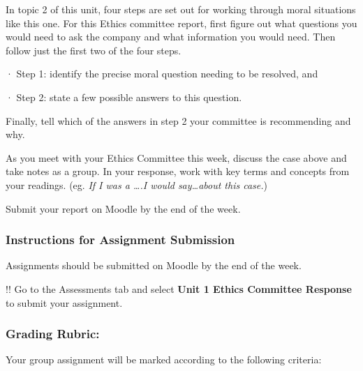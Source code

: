 \documentclass[
]{book}
\begin{document}
In topic 2 of this unit, four steps are set out for working through moral situations like this one. For this Ethics committee report, first figure out what questions you would need to ask the company and what information you would need. Then follow just the first two of the four steps.

· Step 1: identify the precise moral question needing to be resolved, and

· Step 2: state a few possible answers to this question.

Finally, tell which of the answers in step 2 your committee is recommending and why.

As you meet with your Ethics Committee this week, discuss the case above and
take notes as a group. In your response, work with key terms and concepts from
your readings. (eg. \emph{If I was a \ldots.I would say\ldots about this case.})

Submit your report on Moodle by the end of the week.

\hypertarget{instructions-for-assignment-submission-1}{%
\subsubsection{Instructions for Assignment Submission}\label{instructions-for-assignment-submission-1}}

Assignments should be submitted on Moodle by the end of the week.

!! Go to the Assessments tab and select \textbf{Unit 1 Ethics Committee Response} to submit your assignment.

\hypertarget{grading-rubric-1}{%
\subsubsection{Grading Rubric:}\label{grading-rubric-1}}

Your group assignment will be marked according to the following criteria:
\end{document}
